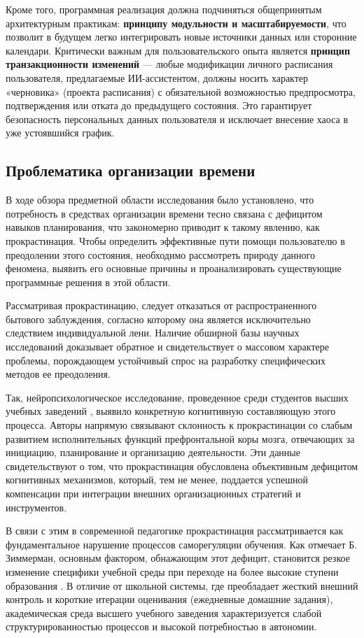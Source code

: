 Кроме того, программная реализация должна подчиняться общепринятым архитектурным практикам: \textbf{принципу модульности и масштабируемости}, что позволит в будущем легко интегрировать новые источники данных или сторонние календари. Критически важным для пользовательского опыта является \textbf{принцип транзакционности изменений} — любые модификации личного расписания пользователя, предлагаемые ИИ-ассистентом, должны носить характер «черновика» (проекта расписания) с обязательной возможностью предпросмотра, подтверждения или отката до предыдущего состояния. Это гарантирует безопасность персональных данных пользователя и исключает внесение хаоса в уже устоявшийся график.


\subsection{Проблематика организации времени}

В ходе обзора предметной области исследования было установлено, что потребность в средствах организации времени тесно связана с дефицитом навыков планирования, что закономерно приводит к такому явлению, как прокрастинация. Чтобы определить эффективные пути помощи пользователю в преодолении этого состояния, необходимо рассмотреть природу данного феномена, выявить его основные причины и проанализировать существующие программные решения в этой области. 

\numberedparagraph
Рассматривая прокрастинацию, следует отказаться от распространенного бытового заблуждения, согласно которому она является исключительно следствием индивидуальной лени. Наличие обширной базы научных исследований доказывает обратное и свидетельствует о массовом характере проблемы, порождающем устойчивый спрос на разработку специфических методов ее преодоления.

Так, нейропсихологическое исследование, проведенное среди студентов высших учебных заведений \cite{Rabin2011}, выявило конкретную когнитивную составляющую этого процесса. Авторы напрямую связывают склонность к прокрастинации со слабым развитием исполнительных функций префронтальной коры мозга, отвечающих за инициацию, планирование и организацию деятельности. Эти данные свидетельствуют о том, что прокрастинация обусловлена объективным дефицитом когнитивных механизмов, который, тем не менее, поддается успешной компенсации при интеграции внешних организационных стратегий и инструментов.

В связи с этим в современной педагогике прокрастинация рассматривается как фундаментальное нарушение процессов саморегуляции обучения. Как отмечает Б. Зиммерман, основным фактором, обнажающим этот дефицит, становится резкое изменение специфики учебной среды при переходе на более высокие ступени образования \cite{Zimmerman2002}. В отличие от школьной системы, где преобладает жесткий внешний контроль и короткие итерации оценивания (ежедневные домашние задания), академическая среда высшего учебного заведения характеризуется слабой структурированностью процессов и высокой потребностью в автономии. 

